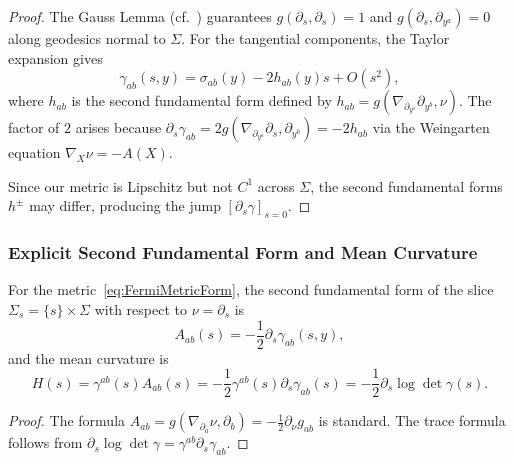 \begin{proof}
The Gauss Lemma (cf.~\cite[Ch.~5]{petersen2016}) guarantees $g(\partial_s, \partial_s) = 1$ and $g(\partial_s, \partial_{y^a}) = 0$ along geodesics normal to $\Sigma$. For the tangential components, the Taylor expansion gives
\[
\gamma_{ab}(s, y) = \sigma_{ab}(y) - 2 h_{ab}(y) s + O(s^2),
\]
where $h_{ab}$ is the second fundamental form defined by $h_{ab} = g(\nabla_{\partial_{y^a}} \partial_{y^b}, \nu)$. The factor of $2$ arises because $\partial_s \gamma_{ab} = 2 g(\nabla_{\partial_{y^a}} \partial_s, \partial_{y^b}) = -2 h_{ab}$ via the Weingarten equation $\nabla_X \nu = -A(X)$.

Since our metric is Lipschitz but not $C^1$ across $\Sigma$, the second fundamental forms $h^\pm$ may differ, producing the jump $[\partial_s \gamma]_{s=0}$.
\end{proof}

\subsubsection{Explicit Second Fundamental Form and Mean Curvature}

\begin{lemma}
\label{lem:ExplicitSFF}
For the metric~\eqref{eq:FermiMetricForm}, the second fundamental form of the slice $\Sigma_s = \{s\} \times \Sigma$ with respect to $\nu = \partial_s$ is
\begin{equation}
\label{eq:SFFFormula}
A_{ab}(s) = -\frac{1}{2} \partial_s \gamma_{ab}(s, y),
\end{equation}
and the mean curvature is
\begin{equation}
\label{eq:MeanCurvFormula}
H(s) = \gamma^{ab}(s) A_{ab}(s) = -\frac{1}{2} \gamma^{ab}(s) \partial_s \gamma_{ab}(s) = -\frac{1}{2} \partial_s \log \det \gamma(s).
\end{equation}
\end{lemma}

\begin{proof}
The formula $A_{ab} = g(\nabla_{\partial_a} \nu, \partial_b) = -\frac{1}{2} \partial_\nu g_{ab}$ is standard. The trace formula follows from $\partial_s \log \det \gamma = \gamma^{ab} \partial_s \gamma_{ab}$.
\end{proof}

